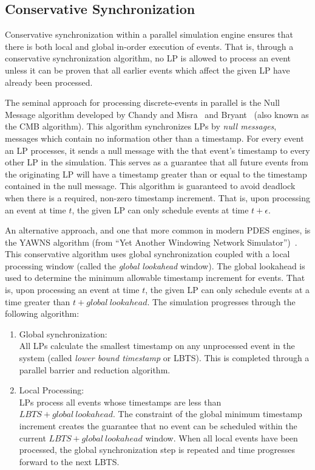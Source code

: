 \subsection{Conservative Synchronization}

Conservative synchronization within a parallel simulation engine ensures that there is both local and global in-order execution of events.
That is, through a conservative synchronization algorithm, no LP is allowed to process an event unless it can be proven that all earlier events which affect the given LP have already been processed.

The seminal approach for processing discrete-events in parallel is the Null Message algorithm developed by Chandy and Misra~\cite{chandy-1981,chandy-misra-1979} and Bryant~\cite{bryant-1977} (also known as the CMB algorithm).
This algorithm synchronizes LPs by \textit{null messages}, messages which contain no information other than a timestamp.
For every event an LP processes, it sends a null message with the that event's timestamp to every other LP in the simulation.
This serves as a guarantee that all future events from the originating LP will have a timestamp greater than or equal to the timestamp contained in the null message.
This algorithm is guaranteed to avoid deadlock when there is a required, non-zero timestamp increment.
That is, upon processing an event at time $t$, the given LP can only schedule events at time $t+\epsilon$.

An alternative approach, and one that more common in modern PDES engines, is the YAWNS algorithm (from ``Yet Another Windowing Network Simulator'')~\cite{yawns}.
This conservative algorithm uses global synchronization coupled with a local processing window (called the \textit{global lookahead} window).
The global lookahead is used to determine the minimum allowable timestamp increment for events.
That is, upon processing an event at time $t$, the given LP can only schedule events at a time greater than $t+global\ lookahead$.
The simulation progresses through the following algorithm:
\begin{enumerate}
	\item Global synchronization:\\
		  All LPs calculate the smallest timestamp on any unprocessed event in the system (called \textit{lower bound timestamp} or LBTS).
		  This is completed through a parallel barrier and reduction algorithm.
	\item Local Processing:\\
		  LPs process all events whose timestamps are less than $LBTS + global\ lookahead$.
		  The constraint of the global minimum timestamp increment creates the guarantee that no event can be scheduled within the current $LBTS + global\ lookahead$ window.
		  When all local events have been processed, the global synchronization step is repeated and time progresses forward to the next LBTS.
\end{enumerate}

